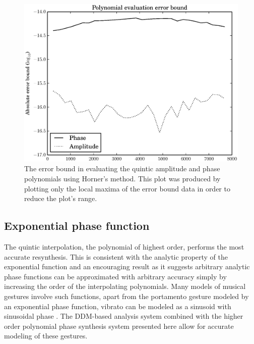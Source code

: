\begin{figure}[!t]
    \centering
    \includegraphics[width=\figwidthscale\textwidth]{plots/mq_mod_quintic_poly_eval_err.eps}
    \caption{The error bound in evaluating the quintic amplitude and phase
    polynomials using Horner's method. This plot was produced by plotting only
    the local maxima of the error bound data in order to reduce the plot's
    range.\label{plot:mqmodquinticpolyevalerr}}
\end{figure}

\subsection{Exponential phase function}

The quintic interpolation, the polynomial of highest order, performs the most
accurate resynthesis. This is consistent with the analytic property of the
exponential function and an encouraging result as it suggests arbitrary analytic
phase functions can be approximated with arbitrary accuracy simply by increasing
the order of the interpolating polynomials. Many models of musical gestures
involve such functions, apart from the portamento gesture modeled by an
exponential phase function, vibrato can be modeled as a sinusoid with sinusoidal
phase \cite{maher1990investigation}. The DDM-based analysis system combined with
the higher order polynomial phase synthesis system presented here allow for
accurate modeling of these gestures.
